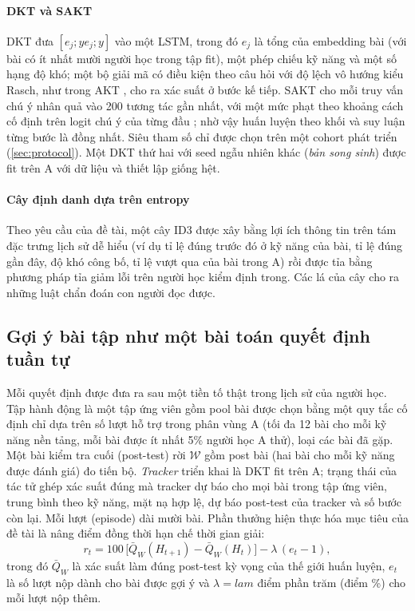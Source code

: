 \paragraph{DKT và SAKT} DKT \citep{piech2015dkt} đưa $[e_j; y e_j; y]$ vào một LSTM, trong đó $e_j$ là tổng của embedding bài (với bài có ít nhất mười người học trong tập fit), một phép chiếu kỹ năng và một số hạng độ khó; một bộ giải mã có điều kiện theo câu hỏi với độ lệch vô hướng kiểu Rasch, như trong AKT \citep{ghosh2020akt}, cho ra xác suất ở bước kế tiếp. SAKT \citep{pandey2019sakt} cho mỗi truy vấn chú ý nhân quả vào 200 tương tác gần nhất, với một mức phạt theo khoảng cách cố định trên logit chú ý của từng đầu \citep{press2022alibi}; nhờ vậy huấn luyện theo khối và suy luận từng bước là đồng nhất. Siêu tham số chỉ được chọn trên một cohort phát triển (\cref{sec:protocol}). Một DKT thứ hai với seed ngẫu nhiên khác (\emph{bản song sinh}) được fit trên A với dữ liệu và thiết lập giống hệt.

\paragraph{Cây định danh dựa trên entropy} Theo yêu cầu của đề tài, một cây ID3 \citep{quinlan1986id3} được xây bằng lợi ích thông tin trên tám đặc trưng lịch sử dễ hiểu (ví dụ tỉ lệ đúng trước đó ở kỹ năng của bài, tỉ lệ đúng gần đây, độ khó công bố, tỉ lệ vượt qua của bài trong A) rồi được tỉa bằng phương pháp tỉa giảm lỗi trên người học kiểm định trong. Các lá của cây cho ra những luật chẩn đoán con người đọc được.

\subsection{Gợi ý bài tập như một bài toán quyết định tuần tự}\label{sec:mdp}

Mỗi quyết định được đưa ra sau một tiền tố thật trong lịch sử của người học. Tập hành động là một tập ứng viên gồm {{pool}} bài được chọn bằng một quy tắc cố định chỉ dựa trên số lượt hỗ trợ trong phân vùng A (tối đa 12 bài cho mỗi kỹ năng nền tảng, mỗi bài được ít nhất 5\% người học A thử), loại các bài đã gặp. Một bài kiểm tra cuối (post-test) rời $\mathcal W$ gồm {{post}} bài (hai bài cho mỗi kỹ năng được đánh giá) đo tiến bộ. \emph{Tracker} triển khai là DKT fit trên A; trạng thái của tác tử ghép xác suất đúng mà tracker dự báo cho mọi bài trong tập ứng viên, trung bình theo kỹ năng, mặt nạ hợp lệ, dự báo post-test của tracker và số bước còn lại. Mỗi lượt (episode) dài mười bài. Phần thưởng hiện thực hóa mục tiêu của đề tài là nâng điểm đồng thời hạn chế thời gian giải:
\begin{equation}
r_t = 100\,\bigl[\bar Q_W(H_{t+1}) - \bar Q_W(H_t)\bigr] - \lambda\,(e_t-1),
\label{eq:reward}
\end{equation}
trong đó $\bar Q_W$ là xác suất làm đúng post-test kỳ vọng của thế giới huấn luyện, $e_t$ là số lượt nộp dành cho bài được gợi ý và $\lambda={{lam}}$ điểm phần trăm (điểm \%) cho mỗi lượt nộp thêm.

